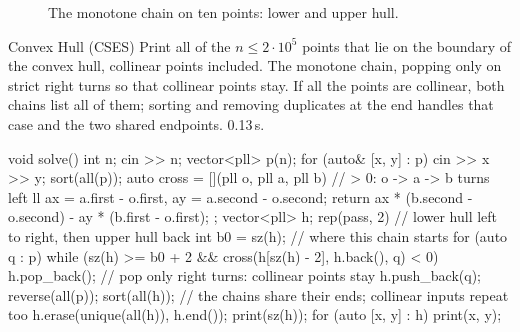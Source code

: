 \begin{figure}[htbp]
\centering
{}
\caption{The monotone chain on ten points: lower and upper hull.}
\label{fig:hull}
\end{figure}


\begin{problem}{Convex Hull (CSES)}
Print all of the $n \le 2 \cdot 10^5$ points that lie on the boundary of the convex hull, collinear points included.
\solution The monotone chain, popping only on strict right turns so that collinear points stay. If all the points are collinear, both
chains list all of them; sorting and removing duplicates at the end handles that case and the two shared endpoints. 0.13\,s.
\end{problem}

\begin{code}
void solve() {
    int n;
    cin >> n;
    vector<pll> p(n);
    for (auto& [x, y] : p) cin >> x >> y;
    sort(all(p));
    auto cross = [](pll o, pll a, pll b) {  // > 0: o -> a -> b turns left
        ll ax = a.first - o.first, ay = a.second - o.second;
        return ax * (b.second - o.second) - ay * (b.first - o.first);
    };
    vector<pll> h;
    rep(pass, 2) {  // lower hull left to right, then upper hull back
        int b0 = sz(h);  // where this chain starts
        for (auto q : p) {
            while (sz(h) >= b0 + 2 && cross(h[sz(h) - 2], h.back(), q) < 0)
                h.pop_back();  // pop only right turns: collinear points stay
            h.push_back(q);
        }
        reverse(all(p));
    }
    sort(all(h));  // the chains share their ends; collinear inputs repeat too
    h.erase(unique(all(h)), h.end());
    print(sz(h));
    for (auto [x, y] : h) print(x, y);
}
\end{code}

